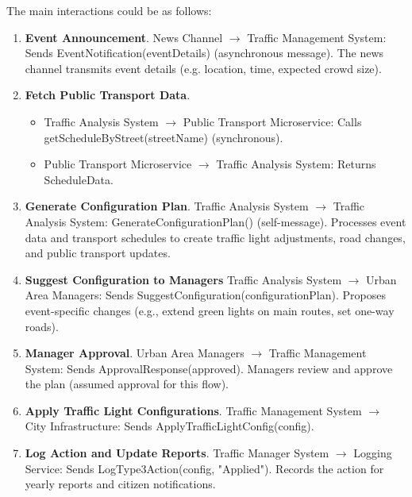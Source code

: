 \documentclass[11.5pt]{article}
\begin{document}
    The main interactions could be as follows:
    \begin{enumerate}
        \item \textbf{Event Announcement}. News Channel $\rightarrow$ Traffic Management System: Sends EventNotification(eventDetails) (asynchronous message). The news channel transmits event details (e.g. location, time, expected crowd size).
        \item \textbf{Fetch Public Transport Data}. 
        \begin{itemize}
            \item Traffic Analysis System $\rightarrow$ Public Transport Microservice: Calls getScheduleByStreet(streetName) (synchronous).
            \item Public Transport Microservice $\rightarrow$ Traffic Analysis System: Returns ScheduleData.
        \end{itemize}
        \item \textbf{Generate Configuration Plan}. Traffic Analysis System $\rightarrow$ Traffic Analysis System: GenerateConfigurationPlan() (self-message). Processes event data and transport schedules to create traffic light adjustments, road changes, and public transport updates.
        \item \textbf{Suggest Configuration to Managers} Traffic Analysis System $\rightarrow$ Urban Area Managers: Sends SuggestConfiguration(configurationPlan). Proposes event-specific changes (e.g., extend green lights on main routes, set one-way roads).
        \item \textbf{Manager Approval}. Urban Area Managers $\rightarrow$ Traffic Management System: Sends ApprovalResponse(approved). Managers review and approve the plan (assumed approval for this flow).
        \item \textbf{Apply Traffic Light Configurations}. Traffic Management System $\rightarrow$ City Infrastructure: Sends ApplyTrafficLightConfig(config).
        \item \textbf{Log Action and Update Reports}. Traffic Manager System $\rightarrow$ Logging Service: Sends LogType3Action(config, "Applied"). Records the action for yearly reports and citizen notifications.
    \end{enumerate}
    
\end{document}

